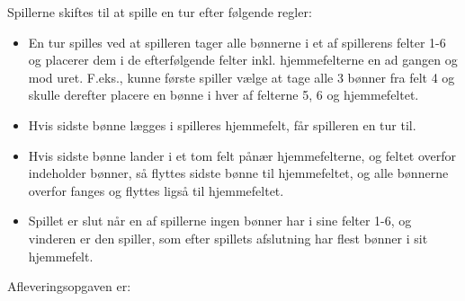 \documentclass[a4paper,12pt]{article}
\begin{document}
Spillerne skiftes til at spille en tur efter følgende regler:
\begin{itemize}
\item En tur spilles ved at spilleren tager alle bønnerne i et af
  spillerens felter 1-6 og placerer dem i de efterfølgende felter
  inkl. hjemmefelterne en ad gangen og mod uret. F.eks., kunne første
  spiller vælge at tage alle 3 bønner fra felt 4 og skulle derefter
  placere en bønne i hver af felterne 5, 6 og hjemmefeltet.
\item Hvis sidste bønne lægges i spilleres hjemmefelt, får spilleren
  en tur til.
\item Hvis sidste bønne lander i et tom felt pånær hjemmefelterne, og
  feltet overfor indeholder bønner, så flyttes sidste bønne til
  hjemmefeltet, og alle bønnerne overfor fanges og flyttes ligså til
  hjemmefeltet.
\item Spillet er slut når en af spillerne ingen bønner har i sine
  felter 1-6, og vinderen er den spiller, som efter spillets
  afslutning har flest bønner i sit hjemmefelt.
\end{itemize}
Afleveringsopgaven er:
\end{document}
